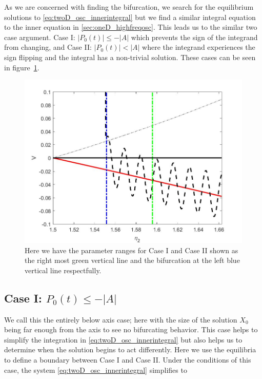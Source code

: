 As we are concerned with finding the bifurcation, we search for the equilibrium solutions to \eqref{eq:twoD_osc_innerintegral} but we find a similar integral equation to the inner equation in \autoref{sec:oneD_highfreqosc}. This leads us to the similar two case argument. Case I: $|P_0(t)|\le -|A|$ which prevents the sign of the integrand from changing, and Case II: $|P_0(t)|<|A|$ where the integrand experiences the sign flipping and the integral has a non-trivial solution. These cases can be seen in figure~\ref{fig:twoD_osc_cases}.

\begin{figure}[H]
\centering
\includegraphics[scale=.25]{twoD/osc_cases.jpg}
\caption{Here we have the parameter ranges for Case I and Case II shown as the right most green vertical line and the bifurcation at the left blue vertical line respectfully.}
\label{fig:twoD_osc_cases}
\end{figure}

\subsection{Case I: $P_0(t)\le -|A|$}
\label{subsec:twoD_highfreqosc_caseI}

We call this the entirely below axis case; here with the size of the solution $X_0$ being far enough from the axis to see no bifurcating behavior. This case helps to simplify the integration in \eqref{eq:twoD_osc_innerintegral} but also helps us to determine when the solution begins to act differently. Here we use the equilibria to define a boundary between Case I and Case II. Under the conditions of this case, the system \eqref{eq:twoD_osc_innerintegral} simplifies to

